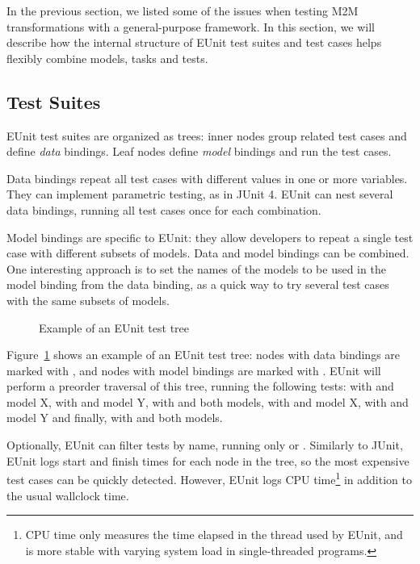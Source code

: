In the previous section, we listed some of the issues when testing M2M transformations with a general-purpose framework. In this section, we will describe how the internal structure of EUnit test suites and test cases helps flexibly combine models, tasks and tests.

\subsection{Test Suites}

EUnit test suites are organized as trees: inner nodes group related test cases and define \emph{data} bindings. Leaf nodes define \emph{model} bindings and run the test cases.

Data bindings repeat all test cases with different values in one or more variables. They can implement parametric testing, as in JUnit 4. EUnit can nest several data bindings, running all test cases once for each combination.

Model bindings are specific to EUnit: they allow developers to repeat a single test case with different subsets of models. Data and model bindings can be combined. One interesting approach is to set the names of the models to be used in the model binding from the data binding, as a quick way to try several test cases with the same subsets of models.

\begin{figure}
  \centering 
  \caption{Example of an EUnit test tree}
  \label{fig:eunit-test-tree}
\end{figure}

Figure~\ref{fig:eunit-test-tree} shows an example of an EUnit test tree: nodes with data bindings are marked with , and nodes with model bindings are marked with . EUnit will perform a preorder traversal of this tree, running the following tests:  with  and model X,  with  and model Y,  with  and both models,  with  and model X,  with  and model Y and finally,  with  and both models.

Optionally, EUnit can filter tests by name, running only  or . Similarly to JUnit, EUnit logs start and finish times for each node in the tree, so the most expensive test cases can be quickly detected. However, EUnit logs CPU time\footnote{CPU time only measures the time elapsed in the thread used by EUnit, and is more stable with varying system load in single-threaded programs.} in addition to the usual wallclock time.

